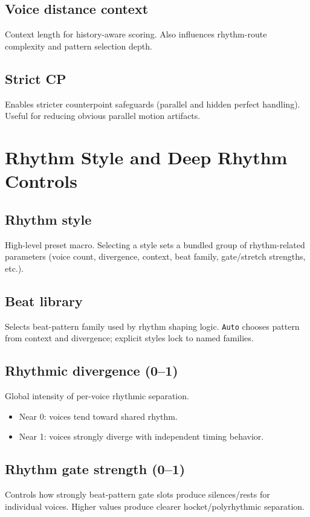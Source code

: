 \documentclass[11pt,a4paper]{article}
\begin{document}
\subsection*{Voice distance context}
Context length for history-aware scoring. Also influences rhythm-route complexity and pattern selection depth.

\subsection*{Strict CP}
Enables stricter counterpoint safeguards (parallel and hidden perfect handling). Useful for reducing obvious parallel motion artifacts.

\section{Rhythm Style and Deep Rhythm Controls}
\subsection*{Rhythm style}
High-level preset macro. Selecting a style sets a bundled group of rhythm-related parameters (voice count, divergence, context, beat family, gate/stretch strengths, etc.).

\subsection*{Beat library}
Selects beat-pattern family used by rhythm shaping logic. \texttt{Auto} chooses pattern from context and divergence; explicit styles lock to named families.

\subsection*{Rhythmic divergence (0--1)}
Global intensity of per-voice rhythmic separation.
\begin{itemize}
  \item Near 0: voices tend toward shared rhythm.
  \item Near 1: voices strongly diverge with independent timing behavior.
\end{itemize}

\subsection*{Rhythm gate strength (0--1)}
Controls how strongly beat-pattern gate slots produce silences/rests for individual voices. Higher values produce clearer hocket/polyrhythmic separation.
\end{document}
